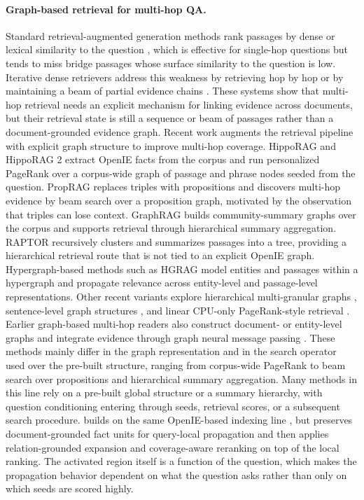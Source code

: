 \paragraph{Graph-based retrieval for multi-hop QA.}
Standard retrieval-augmented generation methods rank passages by dense
or lexical similarity to the question
\citep{karpukhin2020dpr,robertson2009bm25}, which is effective for
single-hop questions but tends to miss bridge passages whose surface
similarity to the question is low. Iterative dense retrievers address
this weakness by retrieving hop by hop or by maintaining a beam of
partial evidence chains \citep{xiong2021mdr,zhao2021beamdr}. These
systems show that multi-hop retrieval needs an explicit mechanism for
linking evidence across documents, but their retrieval state is still a
sequence or beam of passages rather than a document-grounded evidence
graph. Recent work augments the retrieval pipeline with explicit graph
structure to improve multi-hop coverage.
HippoRAG \citep{jimenez2024hipporag} and HippoRAG 2
\citep{gutierrez2025hipporag} extract OpenIE facts from the corpus and
run personalized PageRank over a corpus-wide graph of passage and
phrase nodes seeded from the question. PropRAG \citep{wang2025proprag}
replaces triples with propositions and discovers multi-hop evidence by
beam search over a proposition graph, motivated by the observation that
triples can lose context. GraphRAG \citep{edge2024graphrag} builds
community-summary graphs over the corpus and supports retrieval through
hierarchical summary aggregation. RAPTOR \citep{sarthi2024raptor}
recursively clusters and summarizes passages into a tree, providing a
hierarchical retrieval route that is not tied to an explicit OpenIE
graph. Hypergraph-based methods such as HGRAG \citep{hgrag2024} model
entities and passages within a hypergraph and propagate relevance across
entity-level and passage-level representations. Other recent variants explore
hierarchical multi-granular graphs \citep{hu2026mgrangrag},
sentence-level graph structures \citep{liang2026sentgraph}, and
linear CPU-only PageRank-style retrieval \citep{wang2026sprig}.
Earlier graph-based multi-hop readers also construct document- or
entity-level graphs and integrate evidence through graph neural
message passing \citep{qiu2019dfgn,song2022evidenceintegration}.
These methods mainly differ in the graph representation and in the
search operator used over the pre-built structure, ranging from
corpus-wide PageRank to beam search over propositions and hierarchical
summary aggregation. Many methods in this line rely on a pre-built
global structure or a summary hierarchy, with question conditioning
entering through seeds, retrieval scores, or a subsequent search
procedure. \methodname{} builds on the same OpenIE-based indexing line
\citep{angeli2015leveraging,gutierrez2025hipporag}, but preserves
document-grounded fact units for query-local propagation and then
applies relation-grounded expansion and coverage-aware reranking on top
of the local ranking. The activated region itself is a function of the
question, which makes the propagation behavior dependent on what the
question asks rather than only on which seeds are scored highly.

